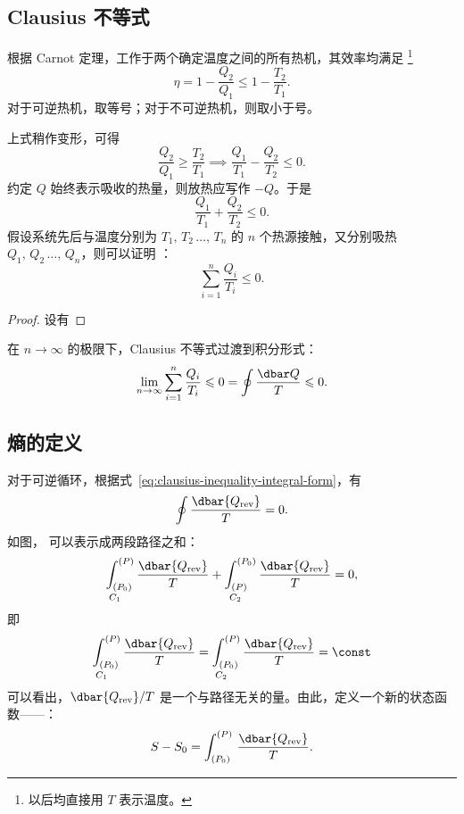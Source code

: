 \subsection{Clausius 不等式}

根据 Carnot 定理，工作于两个确定温度之间的所有热机，其效率均满足
\footnote{以后均直接用 $T$ 表示温度。}
\begin{equation}
  \eta = 1 - \frac{Q_2}{Q_1} \leqslant 1 - \frac{T_2}{T_1}.
\end{equation}
对于可逆热机，取等号；对于不可逆热机，则取小于号。

上式稍作变形，可得
\begin{equation}
  \frac{Q_2}{Q_1} \geqslant \frac{T_2}{T_1}
  \implies \frac{Q_1}{T_1} - \frac{Q_2}{T_2} \leqslant 0.
\end{equation}
约定 $Q$ 始终表示吸收的热量，则放热应写作 $-Q$。于是
\begin{equation}
  \frac{Q_1}{T_1} + \frac{Q_2}{T_2} \leqslant 0.
\end{equation}
假设系统先后与温度分别为 $T_1, \, T_2 \, \dots, \, T_n$ 的 $n$ 个热源接触，又分别吸热
$Q_1, \, Q_2 \, \dots, \, Q_n$，则可以证明 ：
\begin{equation}
  \sum_{i=1}^n \frac{Q_i}{T_i} \leqslant 0.
\end{equation}

\begin{proof}
  设有 %
\end{proof}

在 $n\to\infty$ 的极限下，Clausius 不等式过渡到积分形式：
\begin{equation} \label{eq:clausius-inequality-integral-form}
  \lim_{n\to\infty} \sum_{i=1}^n \frac{Q_i}{T_i} \leqslant 0
  = \oint \frac{\dbar Q}{T} \leqslant 0.
\end{equation}

\subsection{熵的定义}

对于可逆循环，根据式~\eqref{eq:clausius-inequality-integral-form}，有
\begin{equation}
  \oint \frac{\dbar{Q_\text{rev}}}{T} = 0.
\end{equation}
如图，%
可以表示成两段路径之和：
\begin{equation}
  \underset{C_1\phantom{M}}{\int_{(P_0)}^{(P)}} \, \frac{\dbar{Q_\text{rev}}}{T}
  + \underset{C_2\phantom{M}}{\int_{(P)}^{(P_0)}} \, \frac{\dbar{Q_\text{rev}}}{T} = 0,
\end{equation}
即
\begin{equation}
  \underset{C_1\phantom{M}}{\int_{(P_0)}^{(P)}} \, \frac{\dbar{Q_\text{rev}}}{T}
  = \underset{C_2\phantom{M}}{\int_{(P_0)}^{(P)}} \, \frac{\dbar{Q_\text{rev}}}{T} = \const
\end{equation}
可以看出，$\dbar{Q_\text{rev}}/T$ 是一个与路径无关的量。由此，定义一个新的状态函数——：
\begin{equation}
  S - S_0 = \int_{(P_0)}^{(P)} \, \frac{\dbar{Q_\text{rev}}}{T}.
\end{equation}

